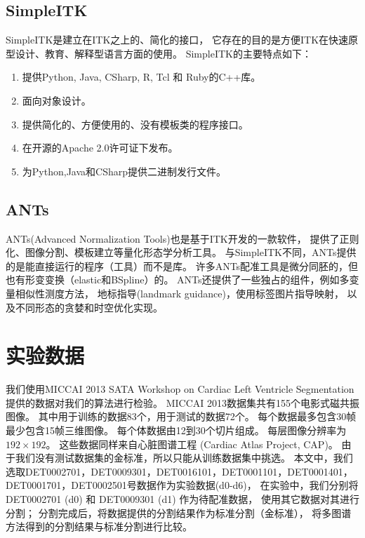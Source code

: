 \subsection{SimpleITK}
SimpleITK是建立在ITK之上的、简化的接口，
它存在的目的是方便ITK在快速原型设计、教育、解释型语言方面的使用。
SimpleITK的主要特点如下：
\begin{enumerate}
\item 提供Python, Java, CSharp, R, Tcl 和 Ruby的C++库。
\item 面向对象设计。
\item 提供简化的、方便使用的、没有模板类的程序接口。
\item 在开源的Apache 2.0许可证下发布。
\item 为Python,Java和CSharp提供二进制发行文件。
\end{enumerate}

\subsection{ANTs}
ANTs(Advanced Normalization Tools)也是基于ITK开发的一款软件，
提供了正则化、图像分割、模板建立等量化形态学分析工具。
与SimpleITK不同，ANTs提供的是能直接运行的程序（工具）而不是库。
许多ANTs配准工具是微分同胚的，但也有形变变换（elastic和BSpline）的。
ANTs还提供了一些独占的组件，例如多变量相似性测度方法，
地标指导(landmark guidance)，使用标签图片指导映射，
以及不同形态的贪婪和时空优化实现。

\section{实验数据}

我们使用MICCAI 2013 SATA Workshop on  Cardiac Left Ventricle Segmentation
提供的数据对我们的算法进行检验。
MICCAI 2013数据集共有155个电影式磁共振图像。
其中用于训练的数据83个，用于测试的数据72个。
每个数据最多包含30帧最少包含15帧三维图像。
每个体数据由12到30个切片组成。
每层图像分辨率为$192\times192$。
这些数据同样来自心脏图谱工程
(Cardiac Atlas Project, CAP)。
由于我们没有测试数据集的金标准，所以只能从训练数据集中挑选。
本文中，我们选取DET0002701，DET0009301，DET0016101，DET0001101，DET0001401，
DET0001701，DET0002501号数据作为实验数据(d0-d6)，
在实验中，我们分别将 DET0002701 (d0) 和 DET0009301 (d1) 作为待配准数据，
使用其它数据对其进行分割；
分割完成后，将数据提供的分割结果作为标准分割（金标准），
将多图谱方法得到的分割结果与标准分割进行比较。

